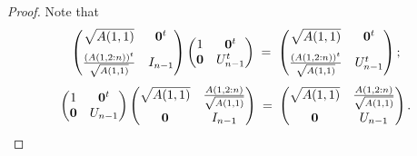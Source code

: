 \begin{proof}
Note that
\begin{equation}
\begin{pmatrix} \sqrt{A(1,1)} & \mathbf{0}^t \\[0.6em]
\frac{(A(1,2:n))^t}{\sqrt{A(1,1)}} & I_{n-1} \end{pmatrix}
\begin{pmatrix} 1 & \mathbf{0}^t \\ \mathbf{0} & U_{n-1}^t \end{pmatrix}
\;=\; \begin{pmatrix} \sqrt{A(1,1)} & \mathbf{0}^t \\[0.6em]
\frac{(A(1,2:n))^t}{\sqrt{A(1,1)}} & U_{n-1}^t \end{pmatrix};
\end{equation}
\begin{equation}
\begin{pmatrix} 1 & \mathbf{0}^t \\ \mathbf{0} & U_{n-1} \end{pmatrix}
\begin{pmatrix} \sqrt{A(1,1)} & \frac{A(1,2:n)}{\sqrt{A(1,1)}} \\[0.6em]
\mathbf{0} & I_{n-1} \end{pmatrix}
\;=\; \begin{pmatrix} \sqrt{A(1,1)} & \frac{A(1,2:n)}{\sqrt{A(1,1)}} \\[0.6em]
\mathbf{0} & U_{n-1} \end{pmatrix}.
\end{equation}


\end{proof}
